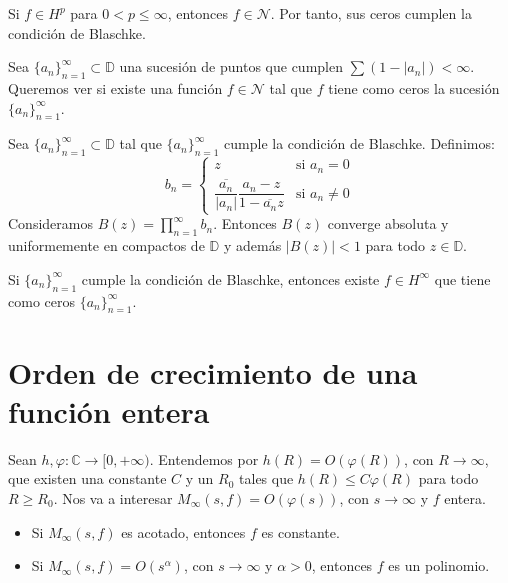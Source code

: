 \begin{remark}
    Si $f \in H^p$ para $0 < p \leq \infty$, entonces $f \in \mathcal{N}$.
    Por tanto, sus ceros cumplen la condición de Blaschke.
\end{remark}

Sea $\{a_n\}_{n=1}^\infty \subset \mathbb{D}$ una sucesión de puntos que cumplen $\sum (1-|a_n|) < \infty$.
Queremos ver si existe una función $f \in \mathcal{N}$ tal que $f$ tiene como ceros la sucesión $\{a_n\}_{n=1}^\infty$.

\begin{theorem}
    Sea $\{a_n\}_{n=1}^\infty \subset \mathbb{D}$ tal que $\{a_n\}_{n=1}^\infty$ cumple la condición de Blaschke.
    Definimos:
    $$b_n = \begin{cases}
            z                                                             & \text{si } a_n = 0    \\
            \dfrac{\overline{a_n}}{|a_n|}\dfrac{a_n-z}{1-\overline{a_n}z} & \text{si } a_n \neq 0
        \end{cases}$$
    Consideramos $B(z) = \prod_{n=1}^\infty b_n$.
    Entonces $B(z)$ converge absoluta y uniformemente en compactos de $\mathbb{D}$ y además $|B(z)| < 1$ para todo $z \in \mathbb{D}$.
\end{theorem}


\begin{remark}
    Si $\{a_n\}_{n=1}^\infty$ cumple la condición de Blaschke, entonces existe $f \in H^\infty$ que tiene como ceros $\{a_n\}_{n=1}^\infty$.
\end{remark}

\section{Orden de crecimiento de una función entera}
Sean $h, \varphi: \mathbb{C} \to [0, +\infty)$.
Entendemos por $h(R) = O(\varphi(R))$, con $R \to \infty$, que existen una constante $C$ y un $R_0$ tales que $h(R) \leq C\varphi(R)$ para todo $R \geq R_0$.
Nos va a interesar $M_\infty(s, f) = O(\varphi(s))$, con $s \to \infty$ y $f$ entera.
\begin{itemize}
    \item Si $M_\infty(s, f)$ es acotado, entonces $f$ es constante.
    \item Si $M_\infty(s, f) = O(s^\alpha)$, con $s \to \infty$ y $\alpha > 0$, entonces $f$ es un polinomio.
\end{itemize}

